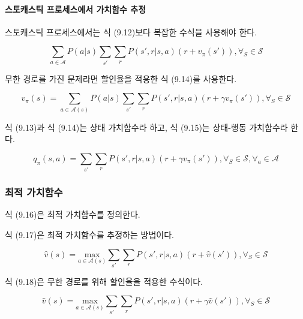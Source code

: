 \documentclass [12pt] {oblivoir}
\let\oldsubsubsection=\subsubsection
\renewcommand{\subsubsection}
{
  \filbreak
  \oldsubsubsection
}
\begin{document}
\paragraph*{스토캐스틱 프로세스에서 가치함수 추정}\mbox{}

스토캐스틱 프로세스에서는 식 (9.12)보다 복잡한 수식을 사용해야 한다.

\begin{equation} \tag{9.12}
  \sum_{a \in \mathcal{A}} P(a \vert s)\sum_{s'}\sum_{r}P(s', r \vert s, a)(r + v_{\pi}(s')), \forall_{S} \in \mathcal{S}
\end{equation}

무한 경로를 가진 문제라면 할인율을 적용한 식 (9.14)를 사용한다.

\begin{equation} \tag{9.14}
  v_{\pi}(s) = \sum_{a \in \mathcal{A}(s)}P(a \vert s)\sum_{s'}\sum_{r}P(s', r \vert s, a)(r + \gamma v_{\pi}(s')), \forall_{S} \in \mathcal{S}
\end{equation}

식 (9.13)과 식 (9.14)는 상태 가치함수라 하고, 식 (9.15)는 상태-행동 가치함수라 한다.

\begin{equation} \tag{9.15}
  q_{\pi}(s, a) = \sum_{s'}\sum_{r}P(s', r \vert s, a)(r + \gamma v_{\pi}(s')), \forall_{S} \in \mathcal{S}, \forall_{a} \in \mathcal{A}
\end{equation}

\vspace{3mm}

\subsubsection{최적 가치함수}

식 (9.16)은 최적 가치함수를 정의한다.

식 (9.17)은 최적 가치함수를 추정하는 방법이다.

\begin{equation} \tag{9.17}
  \hat{v}(s) = \underset{a \in \mathcal{A}(s)}{\mathrm{max}}\sum_{s'}\sum_{r}P(s', r \vert s, a)(r + \hat{v}(s')), \forall_{S} \in \mathcal{S}
\end{equation}

식 (9.18)은 무한 경로를 위해 할인율을 적용한 수식이다.

\begin{equation} \tag{9.18}
  \hat{v}(s) = \underset{a \in \mathcal{A}(s)}{\mathrm{max}}\sum_{s'}\sum_{r}P(s', r \vert s, a)(r + \gamma \hat{v}(s')), \forall_{S} \in \mathcal{S}
\end{equation}
\end{document}
